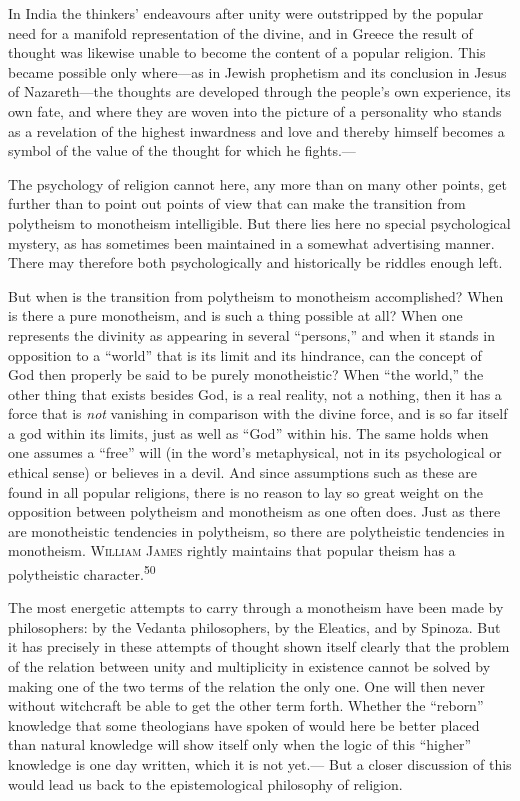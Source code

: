 \documentclass[12pt,a4paper]{book}
\newcommand{\opage}[1]{\marginnote{\footnotesize\textit{[#1]}}}
\begin{document}
In India the thinkers' endeavours after unity were outstripped by the popular need for a manifold
representation of the divine, and in Greece the result of thought was likewise unable to become
the content of a popular religion. This became possible only where---as in Jewish prophetism and
its conclusion in Jesus of Nazareth---the thoughts are developed through the people's own
experience, its own fate, and where they are woven into the picture 
\opage{105}of a personality who stands
as a revelation of the highest inwardness and love and thereby himself becomes a symbol of the
value of the thought for which he fights.---

The psychology of religion cannot here, any more than on many other points, get further than to
point out points of view that can make the transition from polytheism to monotheism intelligible.
But there lies here no special psychological mystery, as has sometimes been maintained in a
somewhat advertising manner. There may therefore both psychologically and historically be riddles
enough left.

But when is the transition from polytheism to monotheism accomplished? When is there a pure
monotheism, and is such a thing possible at all? When one represents the divinity as appearing in
several ``persons,'' and when it stands in opposition to a ``world'' that is its limit and its
hindrance, can the concept of God then properly be said to be purely monotheistic? When ``the
world,'' the other thing that exists besides God, is a real reality, not a nothing, then it has a
force that is \emph{not} vanishing in comparison with the divine force, and is so far itself a god
within its limits, just as well as ``God'' within his. The same holds when one assumes a ``free''
will (in the word's metaphysical, not in its psychological or ethical sense) or believes in a
devil. And since assumptions such as these are found in all popular religions, there is no reason
to lay so great weight on the opposition between polytheism and monotheism as one often does. Just
as there are monotheistic tendencies in polytheism, so there are polytheistic tendencies in
monotheism. \textsc{William James} rightly maintains that popular theism has a polytheistic
character.\textsuperscript{50}

The most energetic attempts to carry through a monotheism have been made by philosophers: by the
Vedanta philosophers, by the Eleatics, and by Spinoza. But it has precisely in these attempts of
thought shown itself clearly that the problem of the relation between unity and multiplicity in
existence cannot be solved by making one of the two terms of the relation the only one. One will
then never without witchcraft be able to get the other term forth. Whether the ``reborn'' knowledge
that some theologians have spoken of would here be better placed than natural knowledge will show
itself only when the logic of this ``higher'' knowledge is one day written, which it is not yet.---%
But a closer discussion of this would lead us back to the epistemological philosophy of religion.
\end{document}
